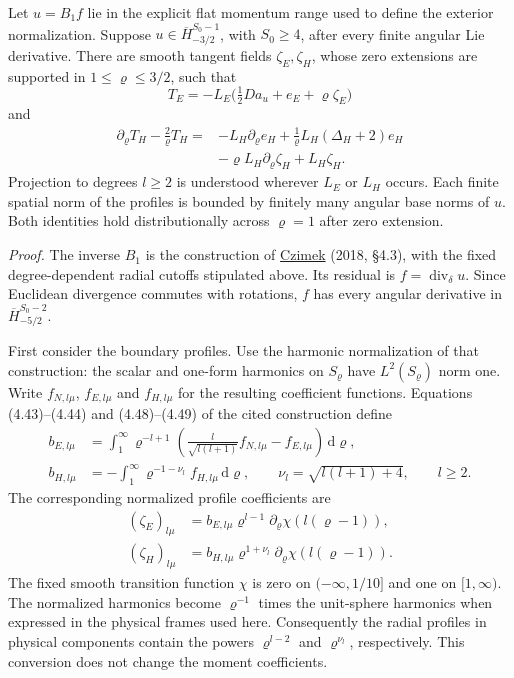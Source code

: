 \documentclass[
  english,
  11pt,
  reqno]{amsart}
\begin{document}
Let \(u=B_1f\) lie in the explicit flat momentum range used to define
the exterior normalization. Suppose \(u\in\overline H^{S_0-1}_{-3/2}\),
with \(S_0\ge4\), after every finite angular Lie derivative. There are
smooth tangent fields \(\zeta_E,\zeta_H\), whose zero extensions are
supported in \(1\le\varrho\le3/2\), such that%
 \[
T_E=-L_E\bigl(\tfrac12Da_u+e_E+\varrho\zeta_E\bigr)
\] and%
 \[
\begin{aligned}
\partial_\varrho T_H-\frac2\varrho T_H
={}&-L_H\partial_\varrho e_H
 +\frac1\varrho L_H(\Delta_H+2)e_H\\
&-\varrho L_H\partial_\varrho\zeta_H+L_H\zeta_H.
\end{aligned}
\] Projection to degrees \(l\ge2\) is understood wherever \(L_E\) or
\(L_H\) occurs. Each finite spatial norm of the profiles is bounded by
finitely many angular base norms of \(u\). Both identities hold
distributionally across \(\varrho=1\) after zero extension.

\emph{Proof.} The inverse \(B_1\) is the construction of
\hyperref[ref-Czimek2018]{Czimek} (2018, §4.3), with the fixed
degree-dependent radial cutoffs stipulated above. Its residual is
\(f=\operatorname{div}_\delta u\). Since Euclidean divergence commutes
with rotations, \(f\) has every angular derivative in
\(\overline H^{S_0-2}_{-5/2}\).

First consider the boundary profiles. Use the harmonic normalization of
that construction: the scalar and one-form harmonics on \(S_\varrho\)
have \(L^2(S_\varrho)\) norm one. Write \(f_{N,l\mu}\), \(f_{E,l\mu}\)
and \(f_{H,l\mu}\) for the resulting coefficient functions. Equations
(4.43)--(4.44) and (4.48)--(4.49) of the cited construction define%
 \[
\begin{aligned}
b_{E,l\mu}
 &=\int_1^\infty \varrho^{-l+1}
       \left(\frac{l}{\sqrt{l(l+1)}}f_{N,l\mu}
                          -f_{E,l\mu}\right)\,\mathrm d\varrho,\\
b_{H,l\mu}
 &=-\int_1^\infty \varrho^{-1-\nu_l}f_{H,l\mu}\,\mathrm d\varrho,
\qquad \nu_l=\sqrt{l(l+1)+4},\qquad l\ge2.
\end{aligned}
\] The corresponding normalized profile coefficients are%
 \[
\begin{aligned}
(\zeta_E)_{l\mu}
 &=b_{E,l\mu}\varrho^{l-1}
       \partial_\varrho\chi(l(\varrho-1)),\\
(\zeta_H)_{l\mu}
 &=b_{H,l\mu}\varrho^{1+\nu_l}
       \partial_\varrho\chi(l(\varrho-1)).
\end{aligned}
\] The fixed smooth transition function \(\chi\) is zero on
\((-\infty,1/10]\) and one on \([1,\infty)\). The normalized harmonics
become \(\varrho^{-1}\) times the unit-sphere harmonics when expressed
in the physical frames used here. Consequently the radial profiles in
physical components contain the powers \(\varrho^{l-2}\) and
\(\varrho^{\nu_l}\), respectively. This conversion does not change the
moment coefficients.
\end{document}
